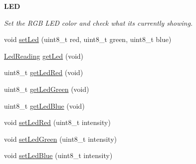 \begin{Indent}{\bf L\+ED}\par
{\em Set the R\+GB L\+ED color and check what it\textquotesingle{}s currently showing. }\begin{DoxyCompactItemize}
\item 
void \hyperlink{class_bean_class_a7af1f9d1edb112f761db9b69686b5a5a}{set\+Led} (uint8\+\_\+t red, uint8\+\_\+t green, uint8\+\_\+t blue)
\item 
\hyperlink{struct_l_e_d___s_e_t_t_i_n_g___t}{Led\+Reading} \hyperlink{class_bean_class_ab73794fbf27d0297ead453ca60ac4aaf}{get\+Led} (void)
\item 
uint8\+\_\+t \hyperlink{class_bean_class_aea8736bf91c03de609233ddb270fb77d}{get\+Led\+Red} (void)
\item 
uint8\+\_\+t \hyperlink{class_bean_class_a5619292a562731e94f97e93432ab3639}{get\+Led\+Green} (void)
\item 
uint8\+\_\+t \hyperlink{class_bean_class_a8dcd68a87dc75dd0fe912483cc05fa43}{get\+Led\+Blue} (void)
\item 
void \hyperlink{class_bean_class_adfc2642320c53819c83bbaa59bbcef9b}{set\+Led\+Red} (uint8\+\_\+t intensity)
\item 
void \hyperlink{class_bean_class_ae1955c0312d1fa90bfeb847dada48c8c}{set\+Led\+Green} (uint8\+\_\+t intensity)
\item 
void \hyperlink{class_bean_class_ac09c0f3cea6025e2e12e8b6c5419434b}{set\+Led\+Blue} (uint8\+\_\+t intensity)
\end{DoxyCompactItemize}
\end{Indent}
